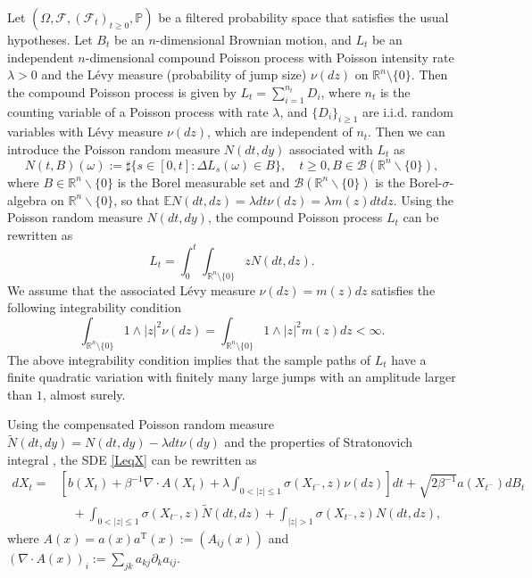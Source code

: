 \documentclass[10pt]{article}
\theoremstyle{definition}
\numberwithin{equation}{section}
\begin{document}
Let $(\Omega, \mathscr{F}, (\mathscr{F}_t)_{t\geq 0}, \mathbb{P})$ be a filtered probability space that satisfies the usual hypotheses.
Let $B_t$ be an $n$-dimensional Brownian motion, and $L_{t}$ be an independent $n$-dimensional compound Poisson process with Poisson intensity rate $\lambda>0$ and the L\'{e}vy measure (probability of jump size) $\nu(dz)$ on $\mathbb{R}^n \setminus\{0\}$. 
Then the compound Poisson process is given by $L_t = \sum_{i=1}^{n_t}D_i$, where $n_t$ is the counting variable of a Poisson process with rate $\lambda$, and $\{D_i\}_{i\geq 1}$ are i.i.d. random variables with L\'{e}vy measure $\nu(dz)$, 
which are independent of $n_t$. Then we can introduce the Poisson random measure $N(dt,dy)$ associated with $L_t$ as
\begin{equation*}
    N(t,B)(\omega):= \sharp \{s\in [0,t]:\Delta L_{s}(\omega) \in B\}, \quad t\geq 0, B\in \mathscr{B}(\mathbb{R}^{n}\backslash \{0\}),
\end{equation*}
where $B \in \mathbb{R}^{n}\backslash \{0\}$ is the Borel measurable set and $\mathscr{B}(\mathbb{R}^{n}\backslash \{0\})$ is the Borel-$\sigma$-algebra on $\mathbb{R}^{n}\backslash \{0\}$, so that $\mathbb{E}N(dt,dz) = \lambda dt\nu(dz) = \lambda m(z)dtdz$. Using the Poisson random measure $N(dt,dy)$, the compound Poisson process $L_t$ can be rewritten as
\begin{equation*}
    L_{t} = \int_{0}^t\int_{\mathbb{R}^n \setminus \{0\}} z N(dt,dz).
\end{equation*}
We assume that the associated L\'{e}vy measure $\nu(dz)=m(z)dz$ satisfies the following integrability condition
\begin{equation*}
    \int_{\mathbb{R}^n \setminus\{0\}} 1\wedge |z|^2 \nu(dz) = \int_{\mathbb{R}^n \setminus\{0\}} 1\wedge |z|^2 m(z)dz < \infty.
\end{equation*}
The above integrability condition implies that the sample paths of $L_t$ have a finite quadratic variation with finitely many large jumps with an amplitude larger than $1$, almost surely.

Using the compensated Poisson random measure $\widetilde{N}(dt,dy)=N(dt,dy)- \lambda dt\nu(dy)$ and the properties of Stratonovich integral \cite{e2019}, the SDE \eqref{LeqX} can be rewritten as
\begin{align}
 dX_t = & \left[ b(X_{t}) + \beta^{-1}\nabla \cdot A(X_t) + \lambda\int_{0< |z| \leq 1} \sigma(X_{t^-},z) \nu(dz) \right]dt + \sqrt{2\beta^{-1}} a(X_{t^-})dB_t \nonumber \\
 & \quad + \int_{0<|z| \leq 1} \sigma(X_{t^{-}},z)\widetilde{N}(dt,dz) + \int_{|z|>1} \sigma(X_{t^{-}},z) N(dt,dz),
\end{align}
where $A(x) = a(x)a^\mathrm{T}(x):= (A_{ij}(x))$ and $(\nabla\cdot A(x))_i:=\sum_{jk}a_{kj}\partial_ka_{ij}$.
\end{document}
